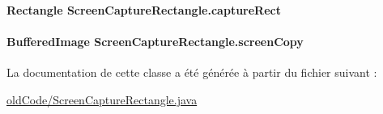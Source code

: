 \paragraph[{capture\+Rect}]{\setlength{\rightskip}{0pt plus 5cm}Rectangle Screen\+Capture\+Rectangle.\+capture\+Rect\hspace{0.3cm}{\ttfamily [package]}}\label{classScreenCaptureRectangle_a0694872df9600fdd35dea40a88f4211f}
\hypertarget{classScreenCaptureRectangle_a225d875cfde59bdcdb664be79d9ecd9c}{}
\paragraph[{screen\+Copy}]{\setlength{\rightskip}{0pt plus 5cm}Buffered\+Image Screen\+Capture\+Rectangle.\+screen\+Copy}\label{classScreenCaptureRectangle_a225d875cfde59bdcdb664be79d9ecd9c}


La documentation de cette classe a été générée à partir du fichier suivant \+:\begin{DoxyCompactItemize}
\item 
\hyperlink{oldCode_2ScreenCaptureRectangle_8java}{old\+Code/\+Screen\+Capture\+Rectangle.\+java}\end{DoxyCompactItemize}
